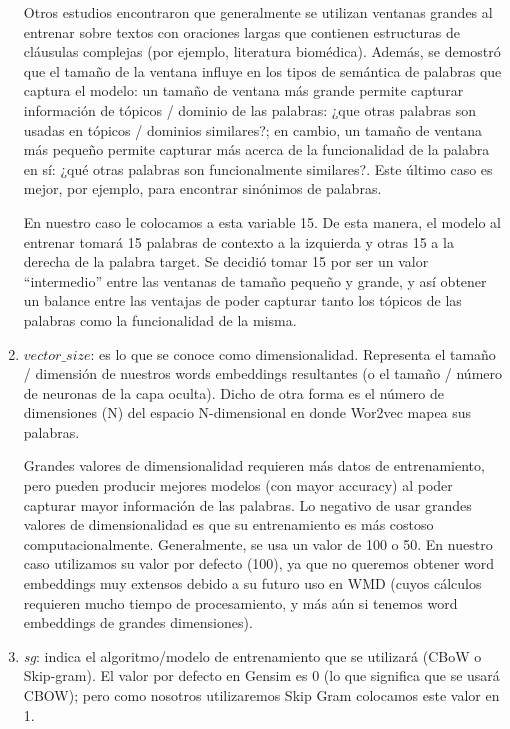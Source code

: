\documentclass[12pt,a4paper]{article}
\begin{document}
\begin{sloppypar}
\begin{enumerate}
Otros estudios\cite{Implem_1,Implem_2} encontraron que generalmente se utilizan ventanas grandes al entrenar sobre textos con oraciones largas que contienen estructuras de cláusulas complejas (por ejemplo, literatura biomédica). Además, se demostró que el tamaño de la ventana influye en los tipos de semántica de palabras que captura el modelo: un tamaño de ventana más grande permite capturar información de tópicos / dominio de las palabras: ¿que otras palabras son usadas en tópicos / dominios similares?; en cambio, un tamaño de ventana más pequeño permite capturar más acerca de la funcionalidad de la palabra en sí: ¿qué otras palabras son funcionalmente similares?. Este último caso es mejor, por ejemplo, para encontrar sinónimos de palabras.

En nuestro caso le colocamos a esta variable 15. De esta manera, el modelo al entrenar tomará 15 palabras de contexto a la izquierda y otras 15 a la derecha de la palabra target. Se decidió tomar 15 por ser un valor “intermedio” entre las ventanas de tamaño pequeño y grande, y así obtener un balance entre las ventajas de poder capturar tanto los tópicos de las palabras como la funcionalidad de la misma. 

\item \textit{$vector\_size$}: es lo que se conoce como dimensionalidad. Representa el tamaño / dimensión de nuestros words embeddings resultantes (o el tamaño / número de neuronas de la capa oculta). Dicho de otra forma es el número de dimensiones (N) del espacio N-dimensional en donde Wor2vec mapea sus palabras. 

Grandes valores de dimensionalidad requieren más datos de entrenamiento, pero pueden producir mejores modelos (con mayor accuracy) al poder capturar mayor información de las palabras. Lo negativo de usar grandes valores de dimensionalidad es que su entrenamiento es más costoso computacionalmente\cite{Implem_2}. Generalmente, se usa un valor de 100 o 50\cite{NLP_26}. En nuestro caso utilizamos su valor por defecto (100), ya que no queremos obtener word embeddings muy extensos debido a su futuro uso en WMD (cuyos cálculos requieren mucho tiempo de procesamiento, y más aún si tenemos word embeddings de grandes dimensiones).  

\item \textit{sg}: indica el algoritmo/modelo de entrenamiento que se utilizará (CBoW o Skip-gram). El valor por defecto en Gensim es 0 (lo que significa que se usará CBOW); pero como nosotros utilizaremos Skip Gram colocamos este valor en 1.


\end{enumerate}
\end{sloppypar}
\end{document}
